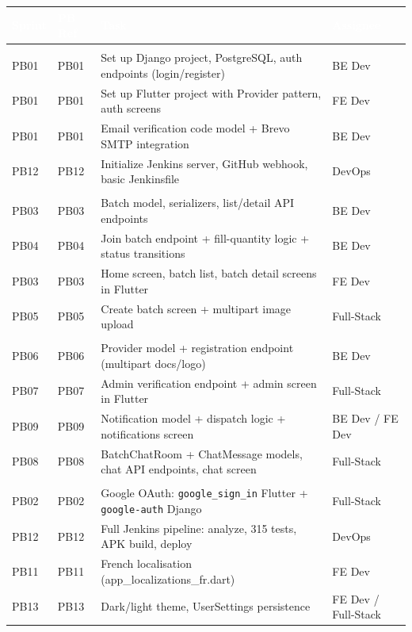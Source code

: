 \documentclass[12pt, a4paper]{report}
\begin{document}
\begin{tabularx}{\textwidth}{l l X l}
\toprule
\rowcolor{tablehead}
\textcolor{white}{\textbf{Sprint}} &
\textcolor{white}{\textbf{PB Ref}} &
\textcolor{white}{\textbf{Task}} &
\textcolor{white}{\textbf{Assignee}}\\
\midrule
\rowcolor{batchitGreen!15}
\multicolumn{4}{l}{\textbf{Sprint 1}}\\
PB01 & PB01 & Set up Django project, PostgreSQL, auth endpoints (login/register) & BE Dev\\
\rowcolor{batchitLight}
PB01 & PB01 & Set up Flutter project with Provider pattern, auth screens & FE Dev\\
PB01 & PB01 & Email verification code model + Brevo SMTP integration & BE Dev\\
\rowcolor{batchitLight}
PB12 & PB12 & Initialize Jenkins server, GitHub webhook, basic Jenkinsfile & DevOps\\
\midrule
\rowcolor{batchitGreen!15}
\multicolumn{4}{l}{\textbf{Sprint 2}}\\
PB03 & PB03 & Batch model, serializers, list/detail API endpoints & BE Dev\\
\rowcolor{batchitLight}
PB04 & PB04 & Join batch endpoint + fill-quantity logic + status transitions & BE Dev\\
PB03 & PB03 & Home screen, batch list, batch detail screens in Flutter & FE Dev\\
\rowcolor{batchitLight}
PB05 & PB05 & Create batch screen + multipart image upload & Full-Stack\\
\midrule
\rowcolor{batchitGreen!15}
\multicolumn{4}{l}{\textbf{Sprint 3}}\\
PB06 & PB06 & Provider model + registration endpoint (multipart docs/logo) & BE Dev\\
\rowcolor{batchitLight}
PB07 & PB07 & Admin verification endpoint + admin screen in Flutter & Full-Stack\\
PB09 & PB09 & Notification model + dispatch logic + notifications screen & BE Dev / FE Dev\\
\rowcolor{batchitLight}
PB08 & PB08 & BatchChatRoom + ChatMessage models, chat API endpoints, chat screen & Full-Stack\\
\midrule
\rowcolor{batchitGreen!15}
\multicolumn{4}{l}{\textbf{Sprint 4}}\\
PB02 & PB02 & Google OAuth: \texttt{google\_sign\_in} Flutter + \texttt{google-auth} Django & Full-Stack\\
\rowcolor{batchitLight}
PB12 & PB12 & Full Jenkins pipeline: analyze, 315 tests, APK build, deploy & DevOps\\
PB11 & PB11 & French localisation (app\_localizations\_fr.dart) & FE Dev\\
\rowcolor{batchitLight}
PB13 & PB13 & Dark/light theme, UserSettings persistence & FE Dev / Full-Stack\\
\bottomrule
\end{tabularx}
\end{document}
